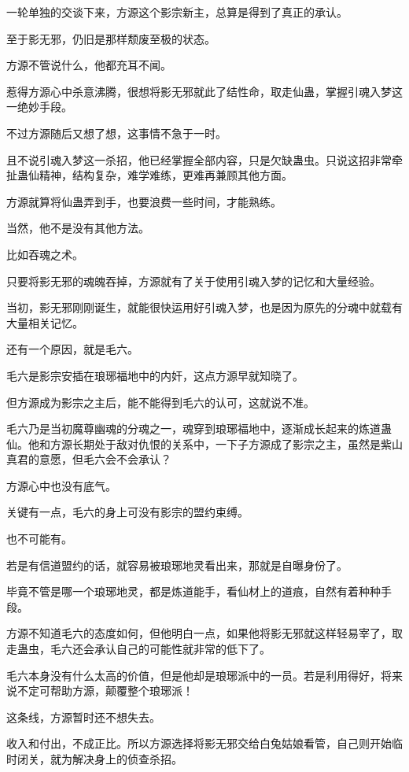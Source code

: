 \begin{this_body}
一轮单独的交谈下来，方源这个影宗新主，总算是得到了真正的承认。

至于影无邪，仍旧是那样颓废至极的状态。

方源不管说什么，他都充耳不闻。

惹得方源心中杀意沸腾，很想将影无邪就此了结性命，取走仙蛊，掌握引魂入梦这一绝妙手段。

不过方源随后又想了想，这事情不急于一时。

且不说引魂入梦这一杀招，他已经掌握全部内容，只是欠缺蛊虫。只说这招非常牵扯蛊仙精神，结构复杂，难学难练，更难再兼顾其他方面。

方源就算将仙蛊弄到手，也要浪费一些时间，才能熟练。

当然，他不是没有其他方法。

比如吞魂之术。

只要将影无邪的魂魄吞掉，方源就有了关于使用引魂入梦的记忆和大量经验。

当初，影无邪刚刚诞生，就能很快运用好引魂入梦，也是因为原先的分魂中就载有大量相关记忆。

还有一个原因，就是毛六。

毛六是影宗安插在琅琊福地中的内奸，这点方源早就知晓了。

但方源成为影宗之主后，能不能得到毛六的认可，这就说不准。

毛六乃是当初魔尊幽魂的分魂之一，魂穿到琅琊福地中，逐渐成长起来的炼道蛊仙。他和方源长期处于敌对仇恨的关系中，一下子方源成了影宗之主，虽然是紫山真君的意愿，但毛六会不会承认？

方源心中也没有底气。

关键有一点，毛六的身上可没有影宗的盟约束缚。

也不可能有。

若是有信道盟约的话，就容易被琅琊地灵看出来，那就是自曝身份了。

毕竟不管是哪一个琅琊地灵，都是炼道能手，看仙材上的道痕，自然有着种种手段。

方源不知道毛六的态度如何，但他明白一点，如果他将影无邪就这样轻易宰了，取走蛊虫，毛六还会承认自己的可能性就非常的低下了。

毛六本身没有什么太高的价值，但是他却是琅琊派中的一员。若是利用得好，将来说不定可帮助方源，颠覆整个琅琊派！

这条线，方源暂时还不想失去。

收入和付出，不成正比。所以方源选择将影无邪交给白兔姑娘看管，自己则开始临时闭关，就为解决身上的侦查杀招。


\end{this_body}
